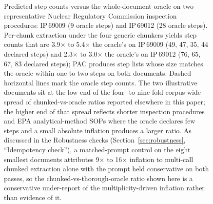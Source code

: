 \documentclass[make,article,submit,oneauthor,pdftex]{Definitions/mdpi}
\begin{document}
\begin{figure}[ht]
\centering
{}
\caption{Predicted step counts versus the whole-document oracle on
two representative Nuclear Regulatory Commission inspection
procedures: IP\,69009 (9 oracle steps) and IP\,69012 (28 oracle
steps). Per-chunk extraction under the four generic chunkers yields
step counts that are 3.9$\times$ to 5.4$\times$ the oracle's on
IP\,69009 (49, 47, 35, 44 declared steps) and 2.3$\times$ to
3.0$\times$ the oracle's on IP\,69012 (76, 65, 67, 83 declared steps);
PAC produces step lists whose size matches the oracle within one to
two steps on both documents. Dashed horizontal lines mark the
oracle step counts. The two illustrative documents sit at the low end
of the four- to nine-fold corpus-wide spread of chunked-vs-oracle
ratios reported elsewhere in this paper; the higher end of that
spread reflects shorter inspection procedures and EPA
analytical-method SOPs where the oracle declares few steps and a
small absolute inflation produces a larger ratio. As discussed in the
Robustness checks (Section~\ref{sec:robustness}, ``Idempotency
check''), a matched-prompt control on the eight smallest documents
attributes 9$\times$ to 16$\times$ inflation to multi-call chunked
extraction alone with the prompt held conservative on both passes, so
the chunked-vs-thorough-oracle ratio shown here is a conservative
under-report of the multiplicity-driven inflation rather than
evidence of it.}
\label{fig:overseg}
\end{figure}
\end{document}
